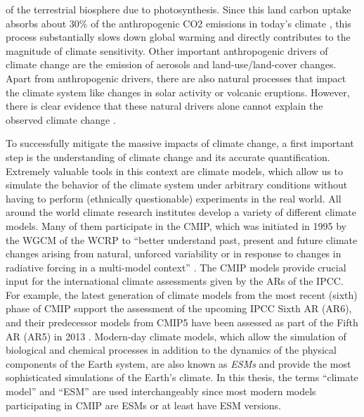 of the terrestrial biosphere due to photosynthesis. Since this land carbon
uptake absorbs about $30 \unit{\%}$ of the anthropogenic \ac{CO2} emissions
in today's climate \autocite{Friedlingstein2020}, this process substantially
slows down global warming and directly contributes to the magnitude of
climate sensitivity. Other important anthropogenic drivers of climate change
are the emission of aerosols and land-use/land-cover changes. Apart from
anthropogenic drivers, there are also natural processes that impact the
climate system like changes in solar activity or volcanic eruptions. However,
there is clear evidence that these natural drivers alone cannot explain the
observed climate change \autocite{Haustein2017}.

To successfully mitigate the massive impacts of climate change, a first
important step is the understanding of climate change and its accurate
quantification. Extremely valuable tools in this context are climate models,
which allow us to simulate the behavior of the climate system under arbitrary
conditions without having to perform (ethnically questionable) experiments in
the real world. All around the world climate research institutes develop a
variety of different climate models. Many of them participate in the \ac{CMIP},
which was initiated in 1995 by the \ac{WGCM} of the \ac{WCRP} to
\enquote{better understand past, present and future climate changes arising
  from natural, unforced variability or in response to changes in radiative
  forcing in a multi-model context} \autocite{WCRP2020}. The \ac{CMIP} models
provide crucial input for the international climate assessments given by the
\acp{AR} of the \ac{IPCC}. For example, the latest generation of climate models
from the most recent (sixth) phase of \ac{CMIP}  support the assessment of the upcoming \ac{IPCC} Sixth
\acl{AR} (\acs{AR}6), and their predecessor models from \acs{CMIP}5
\autocite{Taylor2012} have been assessed as part of the Fifth \acl{AR}
(\acs{AR}5) in 2013 \autocite{Flato2013}. Modern-day climate models, which
allow the simulation of biological and chemical processes in addition to the
dynamics of the physical components of the Earth system, are also known as
\emph{\acp{ESM}} and provide the most sophisticated simulations of the Earth's
climate. In this thesis, the terms \enquote{climate model} and
\enquote{\acl{ESM}} are used interchangeably since most modern models
participating in \ac{CMIP} are \acp{ESM} or at least have \ac{ESM} versions.

